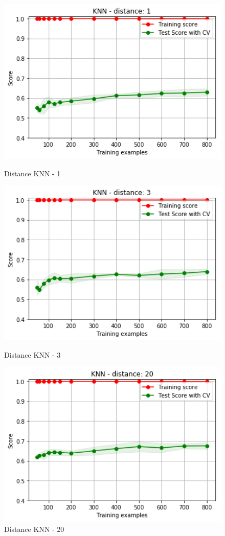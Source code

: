 \documentclass[h]{article}
\begin{document}
\begin{figure}[H]
      \includegraphics[width=1\textwidth,keepaspectratio]{2_knn_1_2.png} 
      \caption*{Distance KNN - 1} 
   \endminipage\hfill
      \includegraphics[width=1\textwidth,keepaspectratio]{2_knn_3_2.png} 
      \caption*{Distance KNN - 3} 
   \endminipage\hfill
      \includegraphics[width=1\textwidth,keepaspectratio]{2_knn_20_2.png} 
      \caption*{Distance KNN - 20} 
   \endminipage\hfill
\end{figure}
 
\end{document}
